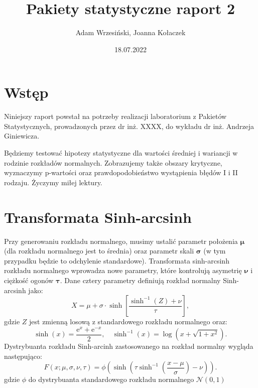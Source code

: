 \documentclass{article}
\title{Pakiety statystyczne raport 2}
\author{Adam Wrzesiński, Joanna Kołaczek}
\date{18.07.2022}
\theoremstyle{break}
\newcommand*{\e}{\mathrm{e}}
\begin{document}
	\maketitle
	\tableofcontents
	\clearpage
	
\section{Wstęp}
	
	Niniejszy raport powstał na potrzeby realizacji laboratorium z Pakietów Statystycznych, prowadzonych przez dr inż. XXXX, do wykładu dr inż. Andrzeja Giniewicza. 
	
	Będziemy testować hipotezy statystyczne dla wartości średniej i wariancji w rodzinie rozkładów normalnych. Zobrazujemy także obszary krytyczne, wyznaczymy p-wartości oraz prawdopodobieństwo wystąpienia błędów I i II rodzaju. Życzymy miłej lektury.
	
	\section{Transformata Sinh-arcsinh}
	Przy generowaniu rozkładu normalnego, musimy ustalić parametr położenia $\mathbf{\mu}$ (dla rozkładu normalnego jest to średnia) oraz parametr skali $\mathbf{\sigma}$ (w tym przypadku będzie to odchylenie standardowe). Transformata sinh-arcsinh rozkładu normalnego wprowadza nowe parametry, które kontrolują asymetrię $\mathbf{\nu}$ i ciężkość ogonów $\mathbf{\tau}$. Dane cztery parametry definiują rozkład normalny Sinh-arcsinh jako:
	$$X = \mu + \sigma \cdot \sinh \left[ \frac{\sinh^{-1}(Z)+\nu}{\tau}\right],$$
	gdzie $Z$ jest zmienną losową z standardowego rozkładu normalnego oraz:
	$$\sinh(x) = \frac{\e^x + \e^{-x}}{2}, \quad \sinh^{-1}(x) = \log(x+\sqrt{1+x^2}).$$
	 Dystrybuanta rozkładu Sinh-arcinh zastosowanego na rozkład normalny wygląda następująco:
	 $$F(x; \mu, \sigma, \nu, \tau) = \phi \left(\sinh \left(\tau \sinh^{-1} \left(\frac{x-\mu}{\sigma}\right)-\nu\right)\right).$$
	 gdzie $\phi$ do dystrybuanta standardowego rozkładu normalnego $\mathcal{N}(0,1)$
\end{document}
